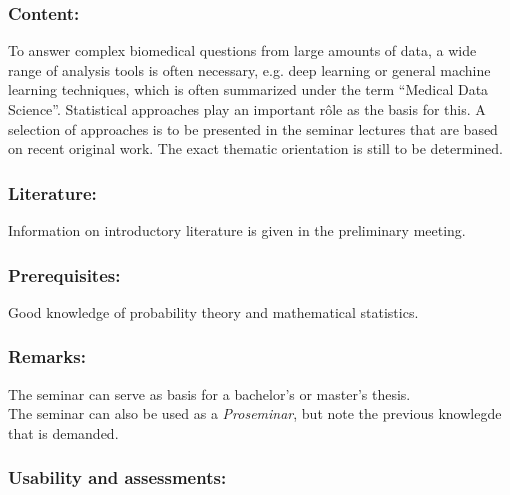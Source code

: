 \documentclass[a4paper,10pt]{article}
\begin{document}
\subsubsection*{\large
    Content:
}
To answer complex biomedical questions from large amounts of data, a wide range of analysis tools is often necessary, e.g. deep learning or general machine learning techniques, which is often summarized under the term ``Medical Data Science''. Statistical approaches play an important rôle as the basis for this. A selection of approaches is to be presented in the seminar lectures that are based on recent original work. The exact thematic orientation is still to be determined.
\subsubsection*{\large
    Literature:
}
Information on introductory literature is given in the preliminary meeting.
\subsubsection*{\large
    Prerequisites:
}
Good knowledge of probability theory and mathematical statistics.
\subsubsection*{\large
    Remarks:
}
The seminar can serve as basis for a bachelor's or master's thesis. \\
The seminar can also be used as a \emph{Proseminar}, but note the previous knowlegde that is demanded.
\cleardoublepage
\subsubsection*{\large
    Usability and assessments:
}
\end{document}
